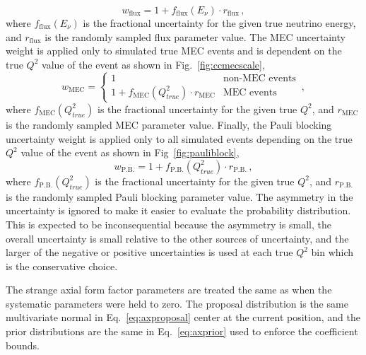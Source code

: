     \begin{equation}
      w_{\textrm{flux}} = 1 + f_{\textrm{flux}}(E_{\nu})\cdot r_{\textrm{flux}} \,,
    \end{equation}
    where $f_{\textrm{flux}}(E_{\nu})$ is the fractional uncertainty for the
    given true neutrino energy, and $r_{\textrm{flux}}$ is the randomly sampled
    flux parameter value. The MEC uncertainty weight is applied only to
    simulated true MEC events and is dependent on the true $Q^2$ value of the
    event as shown in Fig.~\ref{fig:ccmecscale},
    \begin{equation}
      w_{\textrm{MEC}} = 
      \begin{cases}
        1 &\textrm{non-MEC events} \\
        1 + f_{\textrm{MEC}}(Q^2_{true})\cdot r_{\textrm{MEC}}  &\textrm{MEC events}
      \end{cases} \,,
    \end{equation}
    where $f_{\textrm{MEC}}(Q^2_{true})$  is the fractional uncertainty for the given
    true $Q^2$, and $r_{\textrm{MEC}}$ is the randomly sampled MEC parameter
    value. Finally, the Pauli blocking uncertainty weight is applied only to
    all simulated events depending on the true $Q^2$ value of the event as
    shown in Fig~\ref{fig:pauliblock},
    \begin{equation}
      w_{\textrm{P.B.}} = 1 + f_{\textrm{P.B.}}(Q^2_{true})\cdot r_{\textrm{P.B.}} \,,
    \end{equation}
    where $f_{\textrm{P.B.}}(Q^2_{true})$ is the fractional uncertainty for the
    given true $Q^2$, and $r_{\textrm{P.B.}}$ is the randomly sampled Pauli
    blocking parameter value.  The asymmetry in the uncertainty is ignored to
    make it easier to evaluate the probability distribution. This is expected
    to be inconsequential because the asymmetry is small, the overall
    uncertainty is small relative to the other sources of uncertainty, and the
    larger of the negative or positive uncertainties is used at each true $Q^2$
    bin which is the conservative choice.

    The strange axial form factor parameters are treated the same as when the
    systematic parameters were held to zero. The proposal distribution is the
    same multivariate normal in Eq.~\ref{eq:axproposal} center at the current
    position, and the prior distributions are the same in
    Eq.~\ref{eq:axprior} used to enforce the coefficient bounds.

